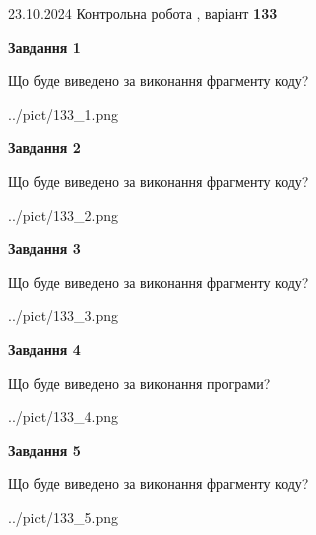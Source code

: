 \documentclass[12pt, ukrainian]{article}
\begin{document}
{\Large{23.10.2024 Контрольна робота , варіант  \No \textbf { 133 }\par}}
{
\begin {large}
{\begin {center}\textbf{Завдання 1}\end {center}}

Що буде виведено за виконання фрагменту коду?\par
\begin{center}
	{../pict/133_1.png}
\end{center}
\newpage

{\begin {center}\textbf{Завдання 2}\end {center}}

Що буде виведено за виконання фрагменту коду?\par
\begin{center}
	{../pict/133_2.png}
\end{center}
\newpage

{\begin {center}\textbf{Завдання 3}\end {center}}

Що буде виведено за виконання фрагменту коду?\par
\begin{center}
	{../pict/133_3.png}
\end{center}
\newpage

{\begin {center}\textbf{Завдання 4}\end {center}}

Що буде виведено за виконання програми?\par
\begin{center}
	{../pict/133_4.png}
\end{center}
\newpage

{\begin {center}\textbf{Завдання 5}\end {center}}

Що буде виведено за виконання фрагменту коду?\par
\begin{center}
	{../pict/133_5.png}
\end{center}
\newpage


\end{large}}
\end{document}
